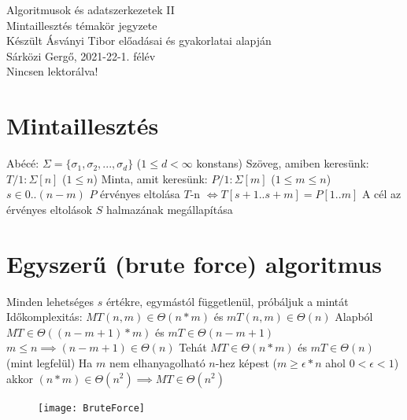 \documentclass[12pt,a4paper]{article}
\begin{document}
\begin{center}
	\huge
	Algoritmusok és adatszerkezetek II\\
	\vspace{1mm}
	\LARGE
	Mintaillesztés témakör jegyzete\\
	\vspace{5mm}
	\large
	Készült Ásványi Tibor előadásai és gyakorlatai alapján\\
	\vspace{5mm}
	Sárközi Gergő, 2021-22-1. félév\\
	Nincsen lektorálva!
\end{center}

\tableofcontents

\pagebreak

\section{Mintaillesztés}

\begin{outline}
	\1 Abécé: $\Sigma = \{\sigma_1, \sigma_2, ..., \sigma_d\}$ \;\; ($1 \le d < \infty$ konstans)
	\1 Szöveg, amiben keresünk: $T/1: \Sigma[n]$ \;\; ($1 \le n$)
	\1 Minta, amit keresünk: $P/1: \Sigma[m]$ \;\; ($1 \le m \le n$)
	\1 $s \in 0..(n-m)$ $P$ érvényes eltolása $T$-n $\Leftrightarrow T[s+1..s+m] = P[1..m]$
	\1 A cél az érvényes eltolások $S$ halmazának megállapítása
\end{outline}

\section{Egyszerű (brute force) algoritmus}

\begin{outline}
	\1 Minden lehetséges $s$ értékre, egymástól függetlenül, próbáljuk a mintát
	\1 Időkomplexitás: $MT(n,m) \in \Theta(n*m)$ és $mT(n,m) \in \Theta(n)$
		\2 Alapból $MT \in \Theta((n-m+1)*m)$ és $mT \in \Theta(n-m+1)$
		\2 $m \le n \implies (n-m+1) \in \Theta(n)$
		\2 Tehát $MT \in \Theta(n*m)$ és $mT \in \Theta(n)$ \;\;(mint legfelül)
		\2 Ha $m$ nem elhanyagolható $n$-hez képest ($m \ge \epsilon * n$ ahol $0 < \epsilon < 1$)\\
		akkor $(n*m) \in \Theta(n^2) \implies MT \in \Theta(n^2)$
\end{outline}

\begin{figure}[h!]
	\centering
	\texttt{[image: BruteForce]}
\end{figure}
\end{document}
